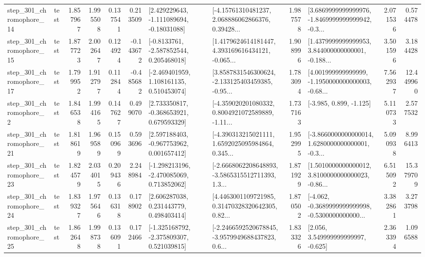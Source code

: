 \begin{tabular}{llrrrrllrlrr}
  step\_301\_chromophore\_14 &      test &      1.857967 &    1.995508 &      0.137541 &  0.213509 &    [2.429229643, -1.111089694, -0.18031088] &  [-4.15761310481237, 2.068886062866376, 0.39428... &       1.987578 &  [3.6869999999999976, -1.8469999999999942, -0.3... &            2.071536 &          0.574478 \\
  step\_301\_chromophore\_15 &      test &      1.877723 &    2.002647 &      0.124924 & -0.143672 &     [-0.8133761, -2.587852544, 0.205468018] &  [1.4179624614181447, 4.393169616434121, -0.065... &       1.908996 &  [1.4379999999999953, 3.844000000000001, -0.188... &            3.501596 &          3.184428 \\
  step\_301\_chromophore\_17 &      test &      1.799952 &    1.912797 &      0.112844 & -0.485682 &    [-2.469401959, 1.108161135, 0.510453074] &  [3.8587831546300624, -2.133125403459385, -0.95... &       1.783094 &  [4.001999999999999, -1.1950000000000003, -0.68... &            7.562937 &         12.449960 \\
   step\_301\_chromophore\_2 &      test &      1.846538 &    1.994165 &      0.147627 &  0.499070 &    [2.733350817, -0.368653921, 0.679593329] &  [-4.359020201080332, 0.8004921072589889, -1.11... &       1.737163 &                            [-3.985, 0.899, -1.125] &            5.110733 &          2.577532 \\
  step\_301\_chromophore\_21 &      test &      1.818619 &    1.969589 &      0.150969 &  0.593696 &    [2.597188403, -0.967753962, 0.001657412] &  [-4.390313215021111, 1.6592025095984864, 0.345... &       1.952995 &  [-3.8660000000000014, 1.6280000000000001, -0.3... &            5.090938 &          8.996413 \\
  step\_301\_chromophore\_23 &      test &      1.824579 &    2.034015 &      0.209436 &  2.248984 &   [-1.298213196, -2.470085069, 0.713852062] &  [-2.6668062208648893, -3.5865315512711393, 1.3... &       1.871929 &  [1.5010000000000012, 3.8100000000000023, -0.86... &            6.515092 &         15.379709 \\
  step\_301\_chromophore\_24 &      test &      1.839327 &    1.975646 &      0.136318 &  0.178902 &     [2.606287038, 0.231443779, 0.498403414] &  [4.4463001109721985, 0.31470328320642305, 0.82... &       1.870502 &  [-4.062, -0.3689999999999998, -0.5300000000000... &            3.382861 &          3.273798 \\
  step\_301\_chromophore\_25 &      test &      1.862648 &    1.998738 &      0.136091 &  0.172466 &   [-1.325168792, -2.375809307, 0.521039815] &  [-2.2466592520678845, -3.9579949688437823, 0.6... &       1.833326 &                 [2.056, 3.549999999999997, -0.625] &            2.363394 &          1.096588 \\

\end{tabular}
